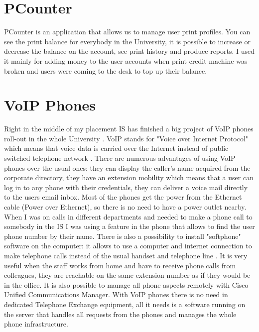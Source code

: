\documentclass[10pt,a4paper,headinclude=true,twoside]{report}
\begin{document}
\section{PCounter}
PCounter is an application that allows us to manage user print profiles. You can see the print balance for everybody in the University, it is possible to increase or decrease the balance on the account, see print history and produce reports. I used it mainly for adding money to the user accounts when print credit machine was broken and users were coming to the desk to top up their balance.

\section{VoIP Phones}
Right in the middle of my placement IS has finished a big project of VoIP phones roll-out in the whole University \cite{VoIP}. VoIP stands for "Voice over Internet Protocol" which means that voice data is carried over the Internet instead of public switched telephone network \cite{VoIP2}. There are numerous advantages of using VoIP phones over the usual ones: they can display the caller's name acquired from the corporate directory, they have an extension mobility which means that a user can log in to any phone with their credentials, they can deliver a voice mail directly to the users email inbox. Most of the phones get the power from the Ethernet cable (Power over Ethernet), so there is no need to have a power outlet nearby. When I was on calls in different departments and needed to make a phone call to somebody in the IS I was using a feature in the phone that allows to find the user phone number by their name. There is also a possibility to install "softphone" software on the computer: it allows to use a computer and internet connection to make telephone calls instead of the usual handset and telephone line \cite{VoIP3}. It is very useful when the staff works from home and have to receive phone calls from colleagues, they are reachable on the same extension number as if they would be in the office. It is also possible to manage all phone aspects remotely with Cisco Unified Communications Manager. With VoIP phones there is no need in dedicated Telephone Exchange equipment, all it needs is a software running on the server that handles all requests from the phones and manages the whole phone infrastructure.
 
\end{document}
